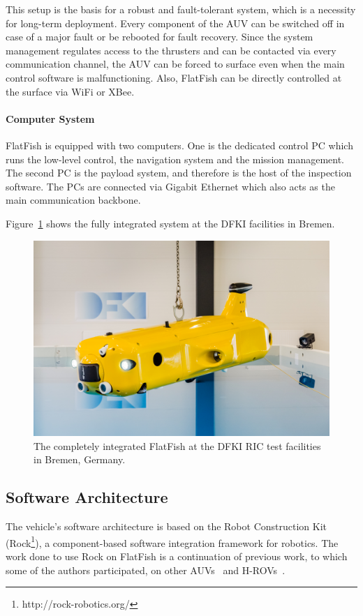 \documentclass[conference]{IEEEtran}
\begin{document}
This setup is the basis for a robust and fault-tolerant system, which is a necessity for 
long-term deployment. Every component of the AUV can be switched off in case of a 
major fault or be rebooted for fault recovery. Since the system management regulates 
access to the thrusters and can be contacted via every communication channel, the AUV 
can be forced to surface even when the main control software is malfunctioning. Also, FlatFish can be directly controlled at the surface via WiFi or XBee.

\paragraph{\textbf{Computer System}} FlatFish is equipped with two computers. 
One is the dedicated control PC which runs the low-level control, the navigation system 
and the mission management. The second PC is the payload system, and therefore is the 
host of the inspection software. The PCs are connected via Gigabit Ethernet which also acts 
as the main communication backbone.

Figure~\ref{fig:flatfish1} shows the fully integrated system at the DFKI facilities in Bremen.
\begin{figure}[!t]
	\centering
	\includegraphics[width=0.9\columnwidth]{FlatFish-1.jpg}
	\caption{The completely integrated FlatFish at the DFKI RIC test facilities in Bremen, 
	Germany.}
	\label{fig:flatfish1}
\end{figure}


\subsection{Software Architecture}

The vehicle's software architecture is based on the Robot Construction Kit
(Rock\footnote{http://rock-robotics.org/}), a component-based software integration
framework for robotics. The work done to use Rock on FlatFish is a continuation of
previous work, to which some of the authors participated, on other AUVs~\cite{albiez2010}
and H-ROVs~\cite{meinecke2013}.
\end{document}
